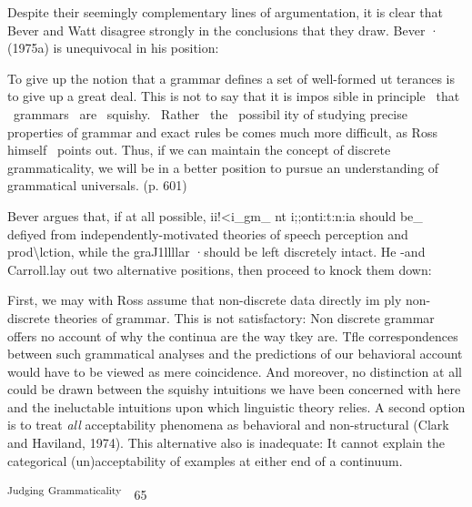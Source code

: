 \begin{styleStandard}
Despite their seemingly complementary lines of argumentation, it is clear that Bever and Watt disagree strongly in the conclusions that they draw. Bever · (1975a) is unequivocal in his position:
\end{styleStandard}


\begin{styleStandard}
To give up the notion that a grammar defines a set of well-formed ut\- terances is to give up a great deal. This is not to say that it is impos\- sible in principle \ that \ grammars \ are \ squishy. \ Rather \ the \ possibil\- ity of studying precise properties of grammar and exact rules be\- comes much more difficult, as Ross himself \ points out. Thus, if we can maintain the concept of discrete grammaticality, we will be in a better position to pursue an understanding of grammatical universals. (p. 601)
\end{styleStandard}


\begin{styleStandard}
Bever argues that, if at all possible, ii!{\textless}i\_gm\_ nt i;;onti:t:n:ia should be\_ defiyed from independently-motivated theories of speech perception and prod{\textbackslash}lction, while the graJ1llllar ·should be left discretely intact. He {}-and Carroll.lay out two alternative positions, then proceed to knock them down:
\end{styleStandard}


\begin{styleStandard}
First, we may with Ross assume that non-discrete data directly im\- ply non-discrete theories of grammar. This is not satisfactory: Non\- discrete grammar offers no account of why the continua are the way tkey are. Tfle correspondences between such grammatical analyses and the predictions of our behavioral account would have to be viewed as mere coincidence. And moreover, no distinction at all could be drawn between the squishy intuitions we have been concerned with here and the ineluctable intuitions upon which linguistic theory relies. A second option is to treat \textit{all}\textit{ }acceptability phenomena as behavioral and non-structural (Clark and Haviland, 1974). This alternative also is inadequate: It cannot explain the categorical (un)acceptability of examples at either end of a continuum.
\end{styleStandard}


\clearpage\setcounter{page}{1}\begin{styleStandard}
\textsuperscript{Judging}\textsuperscript{ }\textsuperscript{Grammaticality}\ \ 65
\end{styleStandard}


